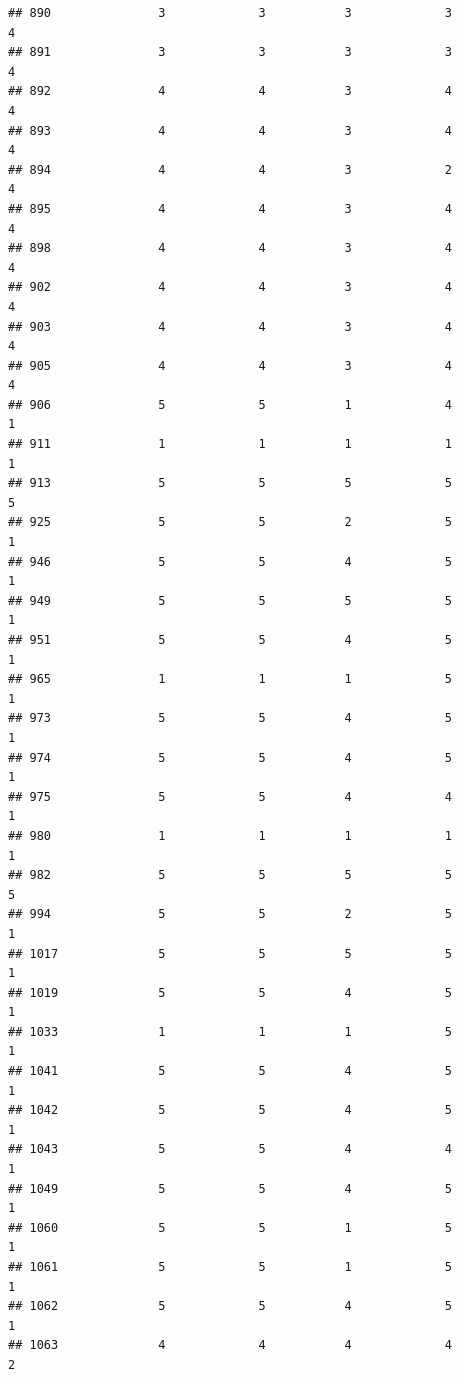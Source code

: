 \documentclass[
]{article}
\begin{document}
\begin{verbatim}
## 890               3             3           3             3            4
## 891               3             3           3             3            4
## 892               4             4           3             4            4
## 893               4             4           3             4            4
## 894               4             4           3             2            4
## 895               4             4           3             4            4
## 898               4             4           3             4            4
## 902               4             4           3             4            4
## 903               4             4           3             4            4
## 905               4             4           3             4            4
## 906               5             5           1             4            1
## 911               1             1           1             1            1
## 913               5             5           5             5            5
## 925               5             5           2             5            1
## 946               5             5           4             5            1
## 949               5             5           5             5            1
## 951               5             5           4             5            1
## 965               1             1           1             5            1
## 973               5             5           4             5            1
## 974               5             5           4             5            1
## 975               5             5           4             4            1
## 980               1             1           1             1            1
## 982               5             5           5             5            5
## 994               5             5           2             5            1
## 1017              5             5           5             5            1
## 1019              5             5           4             5            1
## 1033              1             1           1             5            1
## 1041              5             5           4             5            1
## 1042              5             5           4             5            1
## 1043              5             5           4             4            1
## 1049              5             5           4             5            1
## 1060              5             5           1             5            1
## 1061              5             5           1             5            1
## 1062              5             5           4             5            1
## 1063              4             4           4             4            2

\end{verbatim}
\end{document}
